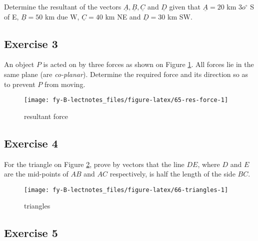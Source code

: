 \documentclass[
  11pt,
  oneside]{book}
\newcommand{\slide}{}
\theoremstyle{definition}
\theoremstyle{definition}
\theoremstyle{definition}
\theoremstyle{definition}
\theoremstyle{remark}
\begin{document}
Determine the resultant of the vectors \(\underline A, \underline B, \underline C\) and \(\underline D\) given that \(\underline A = 20\) km \(3o^\circ\) S of E, \(\underline B = 50\) km due W, \(\underline C = 40\) km NE and \(\underline D=30\) km SW.

\slide

\subsection*{Exercise 3}\label{exercise-3-10}

An object \(P\) is acted on by three forces as shown on Figure \ref{fig:65-res-force}. All forces lie in the same plane (are \emph{co-planar}). Determine the required force and its direction so as to prevent \(P\) from moving.

\begin{figure}

{\centering \texttt{[image: fy-B-lectnotes\_files/figure-latex/65-res-force-1]} 

}

\caption{resultant force}\label{fig:65-res-force}
\end{figure}
\slide

\subsection*{Exercise 4}\label{exercise-4-8}

For the triangle on Figure \ref{fig:66-triangles}, prove by vectors that the line \(DE\), where \(D\) and \(E\) are the mid-points of \(AB\) and \(AC\) respectively, is half the length of the side \(BC\).

\begin{figure}

{\centering \texttt{[image: fy-B-lectnotes\_files/figure-latex/66-triangles-1]} 

}

\caption{triangles}\label{fig:66-triangles}
\end{figure}

\slide

\subsection*{Exercise 5}\label{exercise-5-6}
\end{document}
